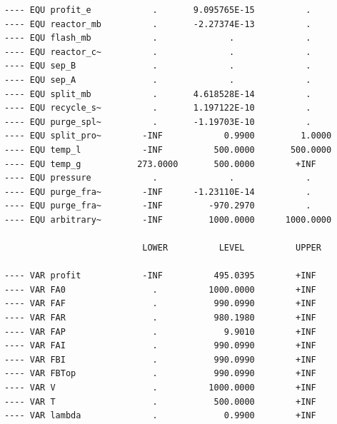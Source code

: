 \documentclass[11pt]{article}
\begin{document}
\begin{verbatim}
---- EQU profit_e            .       9.095765E-15          .          
---- EQU reactor_mb          .       -2.27374E-13          .          
---- EQU flash_mb            .              .              .          
---- EQU reactor_c~          .              .              .          
---- EQU sep_B               .              .              .          
---- EQU sep_A               .              .              .          
---- EQU split_mb            .       4.618528E-14          .          
---- EQU recycle_s~          .       1.197122E-10          .          
---- EQU purge_spl~          .       -1.19703E-10          .          
---- EQU split_pro~        -INF            0.9900         1.0000      
---- EQU temp_l            -INF          500.0000       500.0000      
---- EQU temp_g           273.0000       500.0000        +INF         
---- EQU pressure            .              .              .          
---- EQU purge_fra~        -INF      -1.23110E-14          .          
---- EQU purge_fra~        -INF         -970.2970          .          
---- EQU arbitrary~        -INF         1000.0000      1000.0000      

                           LOWER          LEVEL          UPPER

---- VAR profit            -INF          495.0395        +INF         
---- VAR FA0                 .          1000.0000        +INF         
---- VAR FAF                 .           990.0990        +INF         
---- VAR FAR                 .           980.1980        +INF         
---- VAR FAP                 .             9.9010        +INF         
---- VAR FAI                 .           990.0990        +INF         
---- VAR FBI                 .           990.0990        +INF         
---- VAR FBTop               .           990.0990        +INF         
---- VAR V                   .          1000.0000        +INF         
---- VAR T                   .           500.0000        +INF         
---- VAR lambda              .             0.9900        +INF         

\end{verbatim}
\end{document}

